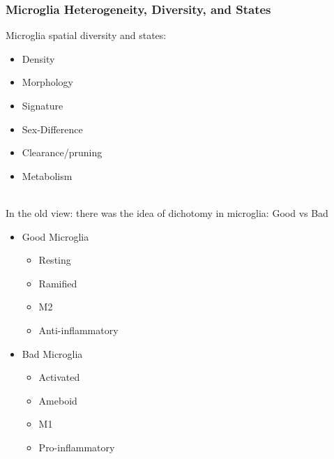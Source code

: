 \begin{itemize}
\begin{itemize}
\subsubsection{Microglia Heterogeneity, Diversity, and States}
Microglia spatial diversity and states:
\begin{itemize}
    \item Density
    \item Morphology
    \item Signature
    \item Sex-Difference
    \item Clearance/pruning
    \item Metabolism
\end{itemize}
\\In the old view: there was the idea of dichotomy in microglia: Good vs Bad
\begin{itemize}
    \item Good Microglia
    \begin{itemize}
        \item Resting
        \item Ramified
        \item M2
        \item Anti-inflammatory
    \end{itemize}
    \item Bad Microglia
    \begin{itemize}
        \item Activated
        \item Ameboid
        \item M1
        \item Pro-inflammatory
    \end{itemize}
    

\end{itemize}
\end{itemize}
\end{itemize}
